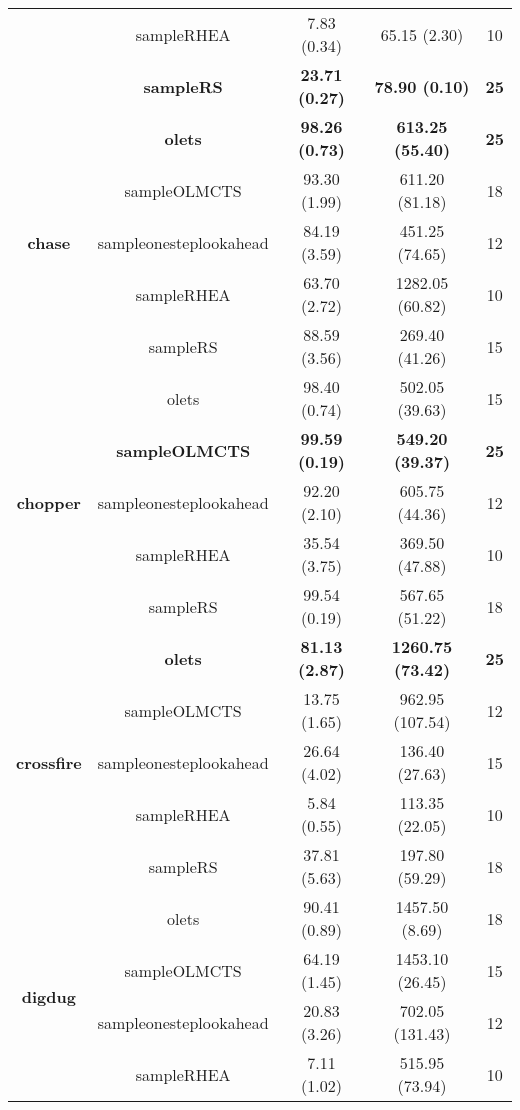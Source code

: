 \begin{table*}[!t]
\begin{center}
\begin{adjustbox}{width=1\textwidth}
\begin{tabular}{|c|c|c|c|c|}
 \\
\cline{2-5}
 & sampleRHEA & 7.83 (0.34) & 65.15 (2.30) & 10
 \\
\cline{2-5}
 & \textbf{sampleRS} & \textbf{23.71 (0.27)} & \textbf{78.90 (0.10)} & \textbf{25}
 \\
\hline
\hline
\cline{2-5}
\multirow{5}{*}{\textbf{chase}} & \textbf{olets} & \textbf{98.26 (0.73)} & \textbf{613.25 (55.40)} & \textbf{25}
 \\
\cline{2-5}
 & sampleOLMCTS & 93.30 (1.99) & 611.20 (81.18) & 18
 \\
\cline{2-5}
 & sampleonesteplookahead & 84.19 (3.59) & 451.25 (74.65) & 12
 \\
\cline{2-5}
 & sampleRHEA & 63.70 (2.72) & 1282.05 (60.82) & 10
 \\
\cline{2-5}
 & sampleRS & 88.59 (3.56) & 269.40 (41.26) & 15
 \\
\hline
\hline
\cline{2-5}
\multirow{5}{*}{\textbf{chopper}} & olets & 98.40 (0.74) & 502.05 (39.63) & 15
 \\
\cline{2-5}
 & \textbf{sampleOLMCTS} & \textbf{99.59 (0.19)} & \textbf{549.20 (39.37)} & \textbf{25}
 \\
\cline{2-5}
 & sampleonesteplookahead & 92.20 (2.10) & 605.75 (44.36) & 12
 \\
\cline{2-5}
 & sampleRHEA & 35.54 (3.75) & 369.50 (47.88) & 10
 \\
\cline{2-5}
 & sampleRS & 99.54 (0.19) & 567.65 (51.22) & 18
 \\
\hline
\hline
\cline{2-5}
\multirow{5}{*}{\textbf{crossfire}} & \textbf{olets} & \textbf{81.13 (2.87)} & \textbf{1260.75 (73.42)} & \textbf{25}
 \\
\cline{2-5}
 & sampleOLMCTS & 13.75 (1.65) & 962.95 (107.54) & 12
 \\
\cline{2-5}
 & sampleonesteplookahead & 26.64 (4.02) & 136.40 (27.63) & 15
 \\
\cline{2-5}
 & sampleRHEA & 5.84 (0.55) & 113.35 (22.05) & 10
 \\
\cline{2-5}
 & sampleRS & 37.81 (5.63) & 197.80 (59.29) & 18
 \\
\hline
\hline
\cline{2-5}
\multirow{5}{*}{\textbf{digdug}} & olets & 90.41 (0.89) & 1457.50 (8.69) & 18
 \\
\cline{2-5}
 & sampleOLMCTS & 64.19 (1.45) & 1453.10 (26.45) & 15
 \\
\cline{2-5}
 & sampleonesteplookahead & 20.83 (3.26) & 702.05 (131.43) & 12
 \\
\cline{2-5}
 & sampleRHEA & 7.11 (1.02) & 515.95 (73.94) & 10

\end{tabular}
\end{adjustbox}
\end{center}
\end{table*}
